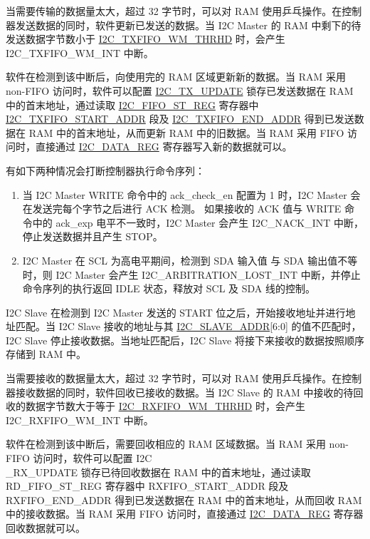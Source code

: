 \documentclass[main\_\_CN.tex]{subfiles}
\begin{document}
当需要传输的数据量太大，超过 32 字节时，可以对 RAM 使用乒乓操作。在控制器发送数据的同时，软件更新已发送的数据。当 I2C Master 的 RAM 中剩下的待发送数据字节数小于 \hyperref[fielddesc:I2CTXFIFOWMTHRHD]{I2C\_TXFIFO\_WM\_THRHD} 时，会产生 I2C\_TXFIFO\_WM\_INT 中断。

软件在检测到该中断后，向使用完的 RAM 区域更新新的数据。当 RAM 采用 non-FIFO 访问时，软件可以配置 \hyperref[fielddesc:I2CTXUPDATE]{I2C\_TX\_UPDATE} 锁存已发送数据在 RAM 中的首末地址，通过读取 \hyperref[regdesc:I2CFIFOSTREG]{I2C\_FIFO\_ST\_REG} 寄存器中 \hyperref[fielddesc:I2CTXFIFOSTARTADDR]{I2C\_TXFIFO\_START\_ADDR} 段及 \hyperref[fielddesc:I2CTXFIFOENDADDR]{I2C\_TXFIFO\_END\_ADDR} 得到已发送数据在 RAM 中的首末地址，从而更新 RAM 中的旧数据。当 RAM 采用 FIFO 访问时，直接通过 \hyperref[regdesc:I2CDATAREG]{I2C\_DATA\_REG} 寄存器写入新的数据就可以。

有如下两种情况会打断控制器执行命令序列：

\begin{enumerate}
\item 当 I2C Master WRITE 命令中的 ack\_check\_en 配置为 1 时，I2C Master 会在发送完每个字节之后进行 ACK 检测。 如果接收的 ACK 值与 WRITE 命令中的 ack\_exp 电平不一致时，I2C Master 会产生 I2C\_NACK\_INT 中断，停止发送数据并且产生 STOP。

\item I2C Master 在 SCL 为高电平期间，检测到  SDA 输入值 与 SDA 输出值不等时，则 I2C Master 会产生 I2C\_ARBITRATION\_LOST\_INT 中断，并停止命令序列的执行返回 IDLE 状态，释放对 SCL 及 SDA 线的控制。

\end{enumerate}

I2C Slave 在检测到 I2C Master 发送的 START 位之后，开始接收地址并进行地址匹配。当 I2C Slave 接收的地址与其 \hyperref[fielddesc:I2CSLAVEADDR]{I2C\_SLAVE\_ADDR}[6:0] 的值不匹配时，I2C Slave 停止接收数据。当地址匹配后，I2C Slave 将接下来接收的数据按照顺序存储到 RAM 中。

当需要接收的数据量太大，超过 32 字节时，可以对 RAM 使用乒乓操作。在控制器接收数据的同时，软件回收已接收的数据。当 I2C Slave 的 RAM 中接收的待回收的数据字节数大于等于 \hyperref[fielddesc:I2CRXFIFOWMTHRHD]{I2C\_RXFIFO\_WM\_THRHD} 时，会产生 I2C\_RXFIFO\_WM\_INT 中断。

软件在检测到该中断后，需要回收相应的 RAM 区域数据。当 RAM 采用 non-FIFO 访问时，软件可以配置 I2C\\\_RX\_UPDATE 锁存已待回收数据在 RAM 中的首末地址，通过读取 RD\_FIFO\_ST\_REG 寄存器中 RXFIFO\_START\_ADDR 段及 RXFIFO\_END\_ADDR 得到已发送数据在 RAM 中的首末地址，从而回收 RAM 中的接收数据。当 RAM 采用 FIFO 访问时，直接通过 \hyperref[regdesc:I2CDATAREG]{I2C\_DATA\_REG} 寄存器回收数据就可以。
\end{document}
